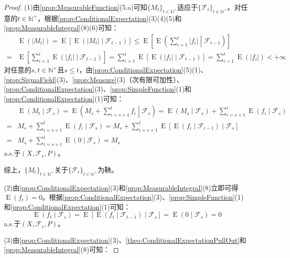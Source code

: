 \begin{proof}
	(1)由\cref{prop:MeasurableFunction}(5.a)可知$\{M_t\}_{t\in\mathbb{N}^+}$适应于$\{\mathscr{F}_t\}_{t\in\mathbb{N}^+}$。对任意的$t\in\mathbb{N}^+$，根据\cref{prop:ConditionalExpectation}(3)(4)(5)和\cref{prop:MeasurableIntegral}(8)(6)可知：
	\begin{align*}
		&\operatorname{E}(|M_t|)=\operatorname{E}[\operatorname{E}(|M_t|\mid\mathscr{F}_{t-1})]\leqslant\operatorname{E}\left[\operatorname{E}\left(\sum_{i=1}^{t}|f_i|\middle|\mathscr{F}_{t-1}\right)\right] \\
		=&\operatorname{E}\left[\sum_{i=1}^{t}\operatorname{E}\left(|f_i|\middle|\mathscr{F}_{t-1}\right)\right]=\sum_{i=1}^{t}\operatorname{E}\left[\operatorname{E}\left(|f_i|\middle|\mathscr{F}_{t-1}\right)\right]=\sum_{i=1}^{t}\operatorname{E}(|f_i|)<+\infty
	\end{align*}
	对任意的$s,t\in\mathbb{N}^+$且$s\leqslant t$，由\cref{prop:ConditionalExpectation}(5)(1)、\cref{prop:SigmaField}(3)、\cref{prop:Measure}(3)（次有限可加性）、\cref{prop:ConditionalExpectation}(3)、\cref{prop:SimpleFunction}(1)和\cref{prop:ConditionalExpectation}(1)可知：
	\begin{align*}
		&\operatorname{E}(M_t\mid\mathscr{F}_s)=\operatorname{E}\left(M_s+\sum_{i=s+1}^{t}f_i\middle|\mathscr{F}_s\right)=\operatorname{E}(M_s\mid\mathscr{F}_s)+\sum_{i=s+1}^{t}\operatorname{E}(f_i\mid\mathscr{F}_s) \\
		=&M_s+\sum_{i=s+1}^{t}\operatorname{E}(f_i\mid\mathscr{F}_s)=M_s+\sum_{i=s+1}^{t}\operatorname{E}[\operatorname{E}(f_i\mid\mathscr{F}_{i-1})\mid\mathscr{F}_s] \\
		=&M_s+\sum_{i=s+1}^{t}\operatorname{E}(0\mid\mathscr{F}_s)=M_s
	\end{align*}
	a.s.于$(X,\mathscr{F}_s,P)$。	\par
	综上，$\{M_t\}_{t\in\mathbb{N}^+}$关于$\{\mathscr{F}_t\}_{t\in\mathbb{N}^+}$为鞅。\par
	(2)由\cref{prop:ConditionalExpectation}(3)和\cref{prop:MeasurableIntegral}(8)立即可得$\operatorname{E}(f_t)=0$。根据\cref{prop:ConditionalExpectation}(3)、\cref{prop:SimpleFunction}(1)和\cref{prop:ConditionalExpectation}(1)可知：
	\begin{equation*}
		\operatorname{E}(f_t\mid\mathscr{F}_s)=\operatorname{E}[\operatorname{E}(f_t\mid\mathscr{F}_{t-1})\mid\mathscr{F}_s]=\operatorname{E}(0\mid\mathscr{F}_s)=0
	\end{equation*}
	a.s.于$(X,\mathscr{F}_s,P)$。\par
	(3)由\cref{prop:ConditionalExpectation}(3)、\cref{theo:ConditionalExpectationPullOut}和\cref{prop:MeasurableIntegral}(8)可知：

\end{proof}
